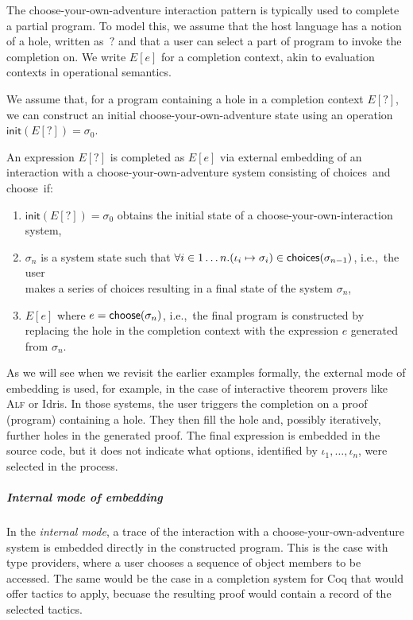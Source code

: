 \documentclass[a4paper,UKenglish,cleveref, autoref, thm-restate]{lipics-v2021}
\newcommand{\ident}[1]{\textsf{#1}}
\newcommand{\sigmaN}{\sigma_0}
\newcommand{\select}{\textnormal{\ident{choose}}}
\newcommand{\choices}{\textnormal{\ident{choices}}}
\begin{document}
The choose-your-own-adventure interaction pattern is typically used to complete a partial program.
To model this, we assume that the host language has a notion of a hole, written as~$?$
and that a user can select a part of program to invoke the completion on. We write $E[e]$ for a
completion context, akin to evaluation contexts in operational semantics.

We assume that, for a program containing a hole in a completion context $E[?]$, we can construct
an initial choose-your-own-adventure state using an operation
$\ident{init}(E[?])=\sigmaN$.

\begin{definition}\label{def:external}
An expression $E[?]$ is completed as $E[e]$ via external embedding of an interaction with
a choose-your-own-adventure system consisting of \choices\ and \select\ if:

\vspace{-0.25em}
\raggedright
\begin{enumerate}
\item $\ident{init}(E[?]) = \sigmaN$ obtains the initial state of a choose-your-own-interaction system,
\item $\sigma_n$ is a system state such that $\forall i\in{1\ldots n}.(\iota_i\mapsto\sigma_i)\in\choices{(\sigma_{n-1})}$,
  i.e.,~the user\\ makes a series of choices resulting in a final state of the system $\sigma_n$,
\item $E[e]$ where $e=\select(\sigma_n)$, i.e.,~the final program is constructed by replacing the hole
  in the completion context with the expression $e$ generated from $\sigma_n$.
\end{enumerate}
\end{definition}

As we will see when we revisit the earlier examples formally, the external mode of embedding is
used, for example, in the case of interactive theorem provers like \textsc{Alf} or Idris.
In those systems, the user triggers the completion on a proof (program) containing a hole.
They then fill the hole and, possibly iteratively, further holes in the generated proof. The final
expression is embedded in the source code, but it does not indicate what options, identified by
$\iota_1, \ldots, \iota_n$, were selected in the process.

\subparagraph{Internal mode of embedding}
In the \emph{internal mode}, a trace of the interaction with a choose-your-own-adventure system
is embedded directly in the constructed program. This is the case with type providers, where a
user chooses a sequence of object members to be accessed. The same would be the case in a completion
system for Coq that would offer tactics to apply, becuase the resulting proof would contain a
record of the selected tactics.
\end{document}
